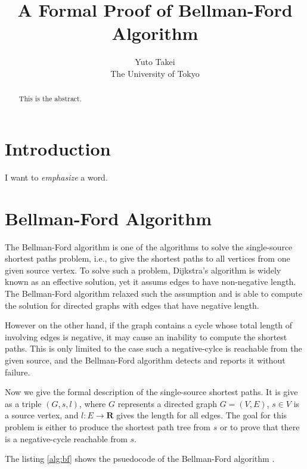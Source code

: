 \documentclass[a4paper,12pt]{article}
\title{A Formal Proof of Bellman-Ford Algorithm}
\author{Yuto Takei \\ The University of Tokyo }
\begin{document}
\maketitle

\begin{abstract}
  This is the abstract.
\end{abstract}

\section{Introduction}

I want to \emph{emphasize} a word.

\section{Bellman-Ford Algorithm}

The Bellman-Ford algorithm is one of the algorithms to solve the single-source shortest paths problem, i.e., to give the shortest paths to all vertices from one given source vertex. To solve such a problem, Dijkstra's algorithm is widely known as an effective solution, yet it assums edges to have non-negative length. The Bellman-Ford algorithm relaxed such the assumption and is able to compute the solution for directed graphs with edges that have negative length.

However on the other hand, if the graph contains a cycle whose total length of involving edges is negative, it may cause an inability to compute the shortest paths. This is only limited to the case such a negative-cylce is reachable from the given source, and the Bellman-Ford algorithm detects and reports it without failure.

Now we give the formal description of the single-source shortest paths. It is give as a triple $ (G,s,l) $, where $ G $ represents a directed graph $ G=(V,E) $, $ s \in V $ is a source vertex, and $ l : E \rightarrow \mathbf{R} $ gives the length for all edges. The goal for this problem is either to produce the shortest path tree from $ s $ or to prove that there is a negative-cycle reachable from $ s $.

The listing \ref{alg:bf} shows the psuedocode of the Bellman-Ford algorithm \cite[p.~532]{algo}.

\newcommand{\initBF}{\ensuremath{\mbox{\sc Initialize-Single-Source}}}
\newcommand{\relaxBF}{\ensuremath{\mbox{\sc Relax}}}
\newcommand{\mainBF}{\ensuremath{\mbox{\sc Bellman-Ford}}}
\end{document}
